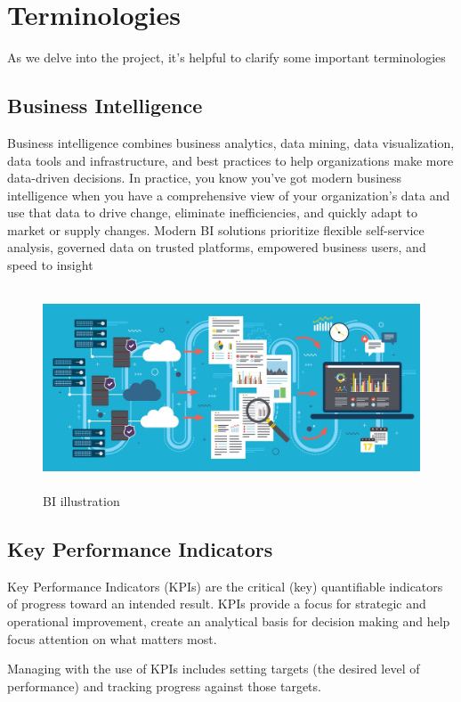 \vspace{0.25cm}

\section{Terminologies}
As we delve into the project, it's helpful to clarify some important terminologies
\subsection{Business Intelligence}
Business intelligence combines business analytics, data mining, data visualization, data tools and infrastructure, and best practices to help organizations make more data-driven decisions. In practice, you know you’ve got modern business intelligence when you have a comprehensive view of your organization’s data and use that data to drive change, eliminate inefficiencies, and quickly adapt to market or supply changes. Modern BI solutions prioritize flexible self-service analysis, governed data on trusted platforms, empowered business users, and speed to insight

\begin{figure}[H]
    \centering
    \includegraphics[height=6cm]{images/chap1/BI.jpeg}
    \caption{BI illustration}
    \label{fig:enter-label}
\end{figure}
\subsection*{Key Performance Indicators}
Key Performance Indicators (KPIs) are the critical (key) quantifiable indicators of progress toward an intended result. KPIs provide a focus for strategic and operational improvement, create an analytical basis for decision making and help focus attention on what matters most.

Managing with the use of KPIs includes setting targets (the desired level of performance) and tracking progress against those targets.

